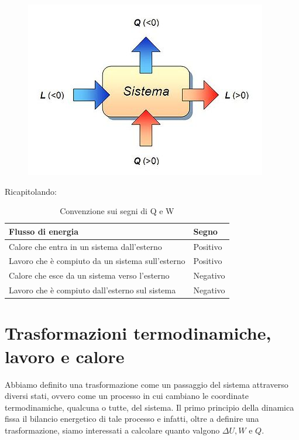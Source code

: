 \documentclass[class=book, crop=false, oneside, 12pt]{standalone}
\begin{document}
\begin{figure}[h]
    \includegraphics[scale=0.8]{termodinamica1}
    \centering
\end{figure}

Ricapitolando:

\begin{table}[h]
    \centering
    \begin{tabular}{|l|l|}
    \hline
    \textbf{Flusso di energia}                       & \textbf{Segno} \\ \hline
    Calore che entra in un sistema dall'esterno      & Positivo       \\ \hline
    Lavoro che è compiuto da un sistema sull'esterno & Positivo       \\ \hline
    Calore che esce da un sistema verso l'esterno    & Negativo       \\ \hline
    Lavoro che è compiuto dall'esterno sul sistema   & Negativo       \\ \hline
    \end{tabular}
    \caption{Convenzione sui segni di Q e W}
    \label{tab:convenzione_segni}
\end{table}

\section{Trasformazioni termodinamiche, lavoro e calore}

Abbiamo definito una trasformazione come un passaggio del sistema attraverso diversi stati, ovvero come un processo in cui cambiano le coordinate termodinamiche, qualcuna o tutte, del sistema.
Il primo principio della dinamica fissa il bilancio energetico di tale processo e infatti, oltre a definire una trasformazione, siamo interessati a calcolare quanto valgono \(\Delta U, W\) e \(Q\). 
\end{document}
